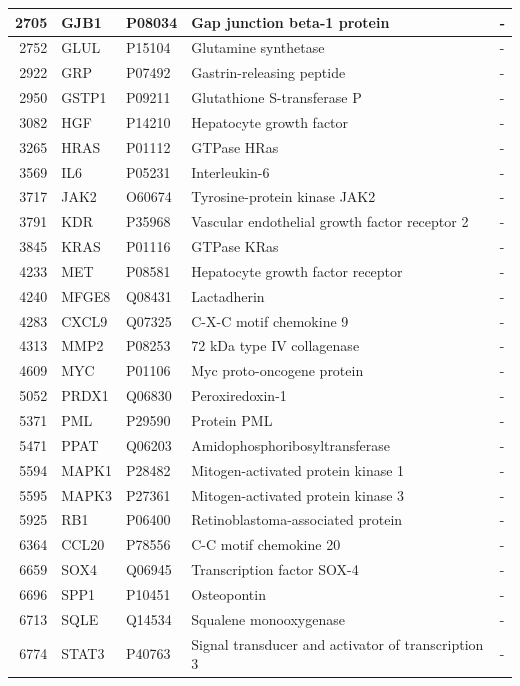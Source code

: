 \documentclass[
]{article}
\begin{document}
\begin{table}[H]
\begin{tabular}[t]{r|l|l|l|l}
\hline
2705 & GJB1 & P08034 & Gap junction beta-1 protein & -\\
\hline
2752 & GLUL & P15104 & Glutamine synthetase & -\\
\hline
2922 & GRP & P07492 & Gastrin-releasing peptide & -\\
\hline
2950 & GSTP1 & P09211 & Glutathione S-transferase P & -\\
\hline
3082 & HGF & P14210 & Hepatocyte growth factor & -\\
\hline
3265 & HRAS & P01112 & GTPase HRas & -\\
\hline
3569 & IL6 & P05231 & Interleukin-6 & -\\
\hline
3717 & JAK2 & O60674 & Tyrosine-protein kinase JAK2 & -\\
\hline
3791 & KDR & P35968 & Vascular endothelial growth factor receptor 2 & -\\
\hline
3845 & KRAS & P01116 & GTPase KRas & -\\
\hline
4233 & MET & P08581 & Hepatocyte growth factor receptor & -\\
\hline
4240 & MFGE8 & Q08431 & Lactadherin & -\\
\hline
4283 & CXCL9 & Q07325 & C-X-C motif chemokine 9 & -\\
\hline
4313 & MMP2 & P08253 & 72 kDa type IV collagenase & -\\
\hline
4609 & MYC & P01106 & Myc proto-oncogene protein & -\\
\hline
5052 & PRDX1 & Q06830 & Peroxiredoxin-1 & -\\
\hline
5371 & PML & P29590 & Protein PML & -\\
\hline
5471 & PPAT & Q06203 & Amidophosphoribosyltransferase & -\\
\hline
5594 & MAPK1 & P28482 & Mitogen-activated protein kinase 1 & -\\
\hline
5595 & MAPK3 & P27361 & Mitogen-activated protein kinase 3 & -\\
\hline
5925 & RB1 & P06400 & Retinoblastoma-associated protein & -\\
\hline
6364 & CCL20 & P78556 & C-C motif chemokine 20 & -\\
\hline
6659 & SOX4 & Q06945 & Transcription factor SOX-4 & -\\
\hline
6696 & SPP1 & P10451 & Osteopontin & -\\
\hline
6713 & SQLE & Q14534 & Squalene monooxygenase & -\\
\hline
6774 & STAT3 & P40763 & Signal transducer and activator of transcription 3 & -\\

\end{tabular}
\end{table}
\end{document}
